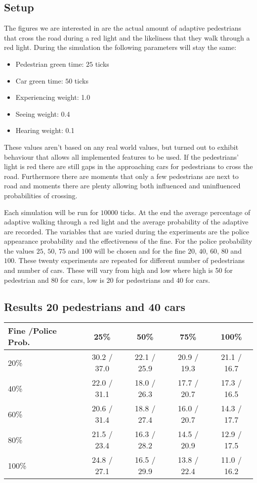 \documentclass[a4paper]{article}
\begin{document}
\subsection{Setup}
The figures we are interested in are the actual amount of adaptive pedestrians that cross the road during a red light and the likeliness that they walk through a red light. During the simulation the following parameters will stay the same:
\begin{itemize}
\item Pedestrian green time: $25$ ticks
\item Car green time: $50$ ticks
\item Experiencing weight: 1.0
\item Seeing weight: 0.4
\item Hearing weight: 0.1
\end{itemize}
These values aren't based on any real world values, but turned out to exhibit behaviour that allows all implemented features to be used. If the pedestrians' light is red there are still gaps in the approaching cars for pedestrians to cross the road. Furthermore there are moments that only a few pedestrians are next to road and moments there are plenty allowing both influenced and uninfluenced probabilities of crossing. 

Each simulation will be run for $10000$ ticks. At the end the average percentage of adaptive walking through a red light and the average probability of the adaptive are recorded. The variables that are varied during the experiments are the police appearance probability and the effectiveness of the fine. For the police probability the values $25$, $50$, $75$ and $100$ will be chosen and for the fine $20$, $40$, $60$, $80$ and $100$. These twenty experiments are repeated for different number of pedestrians and number of cars. These will vary from high and low where high is 50 for pedestrian and 80 for cars, low is 20 for pedestrians and 40 for cars.

\clearpage
\subsection{Results 20 pedestrians and 40 cars}
\begin{table}[H]
\centering
\begin{tabular}{ l | c c c c }
  Fine \slash Police Prob. & 25\% & 50\% & 75\% & 100\% \\ 
  \hline
  20\%  & 30.2 / 37.0 & 22.1 / 25.9 & 20.9 / 19.3 & 21.1 / 16.7  \\
  40\%  & 22.0 / 31.1 & 18.0 / 26.3 & 17.7 / 20.7 & 17.3 / 16.5  \\
  60\%  & 20.6 / 31.4 & 18.8 / 27.4 & 16.0 / 20.7 & 14.3 / 17.7  \\
  80\%  & 21.5 / 23.4 & 16.3 / 28.2 & 14.5 / 20.9 & 12.9 / 17.5  \\
  100\% & 24.8 / 27.1 & 16.5 / 29.9 & 13.8 / 22.4 & 11.0 / 16.2  \\
\end{tabular}
\end{table}
\end{document}
